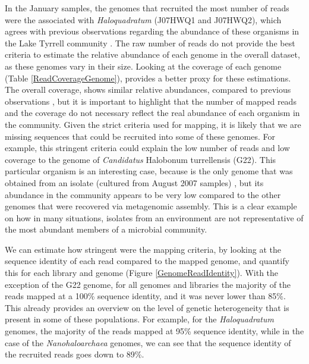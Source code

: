 In the January samples, the genomes that recruited the most number of reads were the associated with \textit{Haloquadratum} (J07HWQ1 and J07HWQ2), which agrees with previous observations regarding the abundance of these organisms in the Lake Tyrrell community \cite{Podell:2013kx}. The raw number of reads do not provide the best criteria to estimate the relative abundance of each genome in the overall dataset, as these genomes vary in their size. Looking at the coverage of each genome (Table \ref{ReadCoverageGenome}), provides a better proxy for these estimations. The overall coverage, shows similar relative abundances, compared to previous observations \cite{Podell:2013kx}, but it is important to highlight that the number of mapped reads and the coverage do not necessary reflect the real abundance of each organism in the community. Given the strict criteria used for mapping, it is likely that we are missing sequences that could be recruited into some of these genomes. For example, this stringent criteria could explain the low number of reads and low coverage to the genome of \textit{Candidatus} Halobonum turrellensis (G22). This particular organism is an interesting case, because is the only genome that was obtained from an isolate (cultured from August 2007 samples) \cite{Ugalde:2013hb}, but its abundance in the community appears to be very low compared to the other genomes that were recovered via metagenomic assembly. This is a clear example on how in many situations, isolates from an environment are not representative of the most abundant members of a microbial community.

We can estimate how stringent were the mapping criteria, by looking at the sequence identity of each read compared to the mapped genome, and quantify this for each library and genome (Figure \ref{GenomeReadIdentity}). With the exception of the G22 genome, for all genomes and libraries the majority of the reads mapped at a 100\% sequence identity, and it was never lower than 85\%. This already provides an overview on the level of genetic heterogeneity that is present in some of these populations. For example, for the \textit{Haloquadratum} genomes, the majority of the reads mapped at 95\% sequence identity, while in the case of the \textit{Nanohaloarchaea} genomes, we can see that the sequence identity of the recruited reads goes down to 89\%.

